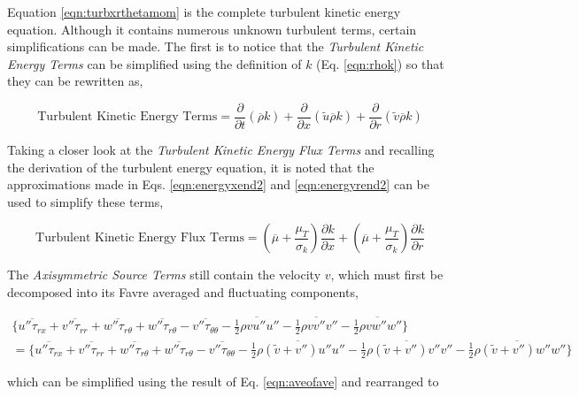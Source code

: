 	Equation \ref{eqn:turbxrthetamom} is the complete turbulent kinetic energy equation.  Although it contains 
numerous unknown turbulent terms, certain simplifications can be made.  The first is to notice that the 
\emph{Turbulent Kinetic Energy Terms} can be simplified using the definition of $k$ (Eq. \ref{eqn:rhok}) so that they 
can be rewritten as,

\begin{equation}
	\textrm{Turbulent Kinetic Energy Terms} = \frac{\partial}{\partial t}(\overline{\rho} k)
	+ \frac{\partial}{\partial x}(\tilde u \overline{\rho} k) + \frac{\partial}{\partial r}(\tilde v \overline{\rho} k)
\label{eqn:tketerms}
\end{equation}

	Taking a closer look at the \emph{Turbulent Kinetic Energy Flux Terms} and recalling the derivation of the 
turbulent energy equation, it is noted that the approximations made in Eqs. \ref{eqn:energyxend2} and \ref{eqn:energyrend2}
can be used to simplify these terms,

\begin{equation}
	\textrm{Turbulent Kinetic Energy Flux Terms} = (\overline{\mu} + \frac{\mu_T}{\sigma_k})\frac{\partial k}{\partial x}
	+ (\overline{\mu} + \frac{\mu_T}{\sigma_k})\frac{\partial k}{\partial r}
\label{eqn:tkefluxterms}
\end{equation}	

	The \emph{Axisymmetric Source Terms} still contain the velocity $v$, which must first be decomposed into its Favre 
averaged and fluctuating components,

\begin{displaymath}
   \begin{array}{c}
	\Big\{\overline{u''\tau_{rx}} + \overline{v''\tau_{rr}} + \overline{w''\tau_{r\theta}}
	+ \overline{w''\tau_{r\theta}} -\overline{v''\tau_{\theta \theta}}
	- \overline{\frac{1}{2} \rho v u'' u''} - \overline{\frac{1}{2} \rho v v''v''} 
	- \overline{\frac{1}{2} \rho v w'' w''} \Big\} 
	\\
	= \Big\{\overline{u''\tau_{rx}} + \overline{v''\tau_{rr}} + \overline{w''\tau_{r\theta}}
	+ \overline{w''\tau_{r\theta}} -\overline{v''\tau_{\theta \theta}}
	- \overline{\frac{1}{2} \rho (\tilde v + v'') u'' u''} - \overline{\frac{1}{2} \rho (\tilde v + v'') v''v''} 
	- \overline{\frac{1}{2} \rho (\tilde v + v'') w'' w''} \Big\} 
   \end{array}	
\end{displaymath}

	which can be simplified using the result of Eq. \ref{eqn:aveofave} and rearranged to

